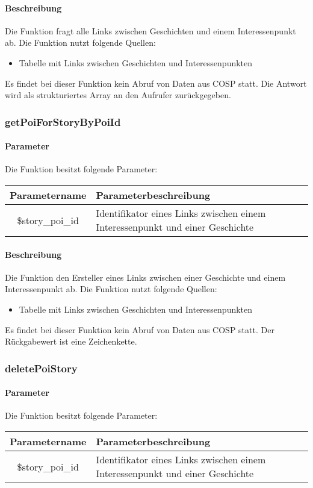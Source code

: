 \paragraph{Beschreibung} Die Funktion fragt alle Links zwischen Geschichten und einem Interessenpunkt ab. Die Funktion nutzt folgende Quellen:
\begin{itemize}
	\item Tabelle mit Links zwischen Geschichten und Interessenpunkten
\end{itemize}
Es findet bei dieser Funktion kein Abruf von Daten aus {\glqq COSP\grqq} statt. Die Antwort wird als strukturiertes Array an den Aufrufer zurückgegeben.
\subsubsection{getPoiForStoryByPoiId}
\paragraph{Parameter} Die Funktion besitzt folgende Parameter:
\begin{table}[H]
	\begin{tabular}{|c|p{11cm}|}
		\hline
		\textbf{Parametername} & \textbf{Parameterbeschreibung} \\ \hline
		\$story\_poi\_id  & Identifikator eines Links zwischen einem Interessenpunkt und einer Geschichte \\ \hline
	\end{tabular}
\end{table}
\paragraph{Beschreibung} Die Funktion den Ersteller eines Links zwischen einer Geschichte und einem Interessenpunkt ab. Die Funktion nutzt folgende Quellen:
\begin{itemize}
	\item Tabelle mit Links zwischen Geschichten und Interessenpunkten
\end{itemize}
Es findet bei dieser Funktion kein Abruf von Daten aus {\glqq COSP\grqq} statt. Der Rückgabewert ist eine Zeichenkette.
\subsubsection{deletePoiStory}
\paragraph{Parameter} Die Funktion besitzt folgende Parameter:
\begin{table}[H]
	\begin{tabular}{|c|p{11cm}|}
		\hline
		\textbf{Parametername} & \textbf{Parameterbeschreibung} \\ \hline
		\$story\_poi\_id  & Identifikator eines Links zwischen einem Interessenpunkt und einer Geschichte \\ \hline
	\end{tabular}
\end{table}
